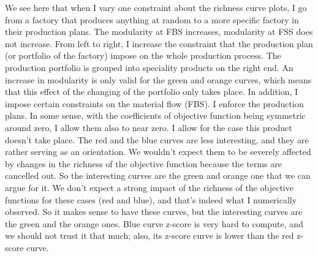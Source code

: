 {	We see here that when I vary one constraint about the richness curve plots, I go from a factory that produces anything at random to a more specific factory in their production plans. The modularity at FBS increases, modularity at FSS does not increase. From left to right, I increase the constraint that the production plan (or portfolio of the factory) impose on the whole production process. The production portfolio is grouped into speciality products on the right end. An increase in modularity is only valid for the green and orange curves, which means that this effect of the changing of the portfolio only takes place. In addition, I impose certain constraints on the material flow (FBS). I enforce the production plans. In some sense, with the coefficients of objective function being symmetric around zero, I allow them also to near zero. I allow for the case this product doesn't take place. The red and the blue curves are less interesting, and they are rather serving as an orientation. We wouldn't expect them to be severely affected by changes in the richness of the objective function because the terms are cancelled out. So the interesting curves are the green and orange one that we can argue for it. We don't expect a strong impact of the richness of the objective functions for these cases (red and blue), and that's indeed what I numerically observed. So it makes sense to have these curves, but the interesting curves are the green and the orange ones.
	Blue curve z-score is very hard to compute, and we should not trust it that much; also, its z-score curve is lower than the red z-score curve. 
}



